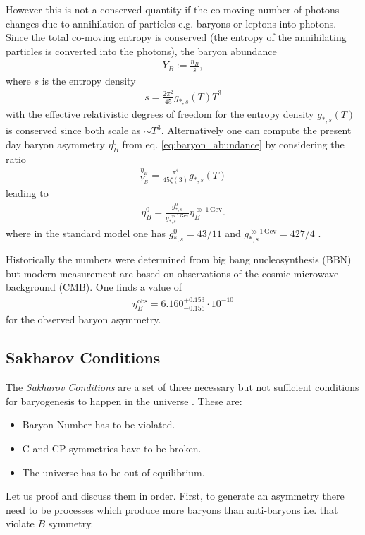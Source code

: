 \documentclass[13pt,a4paper,titlepage]{article}
\begin{document}
However this is not a conserved quantity if the co-moving number of photons changes due to annihilation
of particles e.g. baryons or leptons into photons.
Since the total co-moving entropy is conserved (the entropy of the annihilating particles is converted into the photons), the baryon abundance
\begin{align}
    \label{eq:baryon_abundance}
    Y_B := \frac{n_B}{s},
\end{align}
where $s$ is the entropy density
\begin{align}
    s = \frac{2 \pi^2}{45} g_{*, s}(T) T^3
\end{align}
with the effective relativistic degrees of freedom for the entropy density $g_{*, s}(T)$
is conserved since both scale as $\sim T^3$.
Alternatively one can compute the present day baryon asymmetry $\eta_B^0$ from eq. \eqref{eq:baryon_abundance} by considering the ratio
\begin{align}
    \frac{\eta_B}{Y_B} = \frac{\pi^4}{45 \zeta(3)} g_{*, s}(T)
\end{align}
leading to
\begin{align}
    \label{eq:asymmetry_redshift}
    \eta_B^0 = \frac{g_{*,s}^0}{g_{*, s}^{\gg 1 \, \mathrm{Gev}}} \eta_B^{\gg 1 \, \mathrm{Gev}}.
\end{align}
where in the standard model one has $g_{*,s}^0 = 43/11$ and $g_{*, s}^{\gg 1 \, \mathrm{Gev}} = 427/4$ \cite[sec. 3.4]{the_early_universe_kolb_and_turner}.

\noindent
Historically the numbers were determined from big bang nucleosynthesis (BBN) \cite[sec. III.1]{Matter_and_Antimatter_Canetti_2012} but modern measurement are based on observations of the cosmic microwave background (CMB).
One finds a value of \cite[eq. 7]{Matter_and_Antimatter_Canetti_2012}
\begin{align}
    \label{eq:observed_bau}
    \eta_B^\mathrm{obs} = 6.160^{+ 0.153}_{-0.156} \cdot 10^{-10}
\end{align}
for the observed baryon asymmetry.

\subsection{Sakharov Conditions}
\label{sec:sakharov_conditions}

The \emph{Sakharov Conditions} are a set of three necessary but not sufficient conditions for baryogenesis to happen in the universe \cite{Sakharov_1991}. These are:
\begin{itemize}
    \item Baryon Number has to be violated.
    \item C and CP symmetries have to be broken.
    \item The universe has to be out of equilibrium.
\end{itemize}
Let us proof and discuss them in order.
First, to generate an asymmetry there need to be processes which produce more baryons than anti-baryons i.e. that violate $B$ symmetry.
\end{document}
